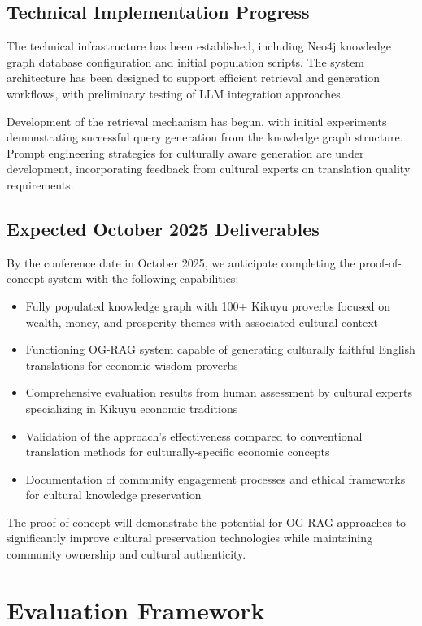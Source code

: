 \documentclass[
]{ceurart}
\begin{document}
\subsection{Technical Implementation Progress}

The technical infrastructure has been established, including Neo4j knowledge graph database configuration and initial population scripts. The system architecture has been designed to support efficient retrieval and generation workflows, with preliminary testing of LLM integration approaches.

Development of the retrieval mechanism has begun, with initial experiments demonstrating successful query generation from the knowledge graph structure. Prompt engineering strategies for culturally aware generation are under development, incorporating feedback from cultural experts on translation quality requirements.

\subsection{Expected October 2025 Deliverables}

By the conference date in October 2025, we anticipate completing the proof-of-concept system with the following capabilities:

\begin{itemize}
\item Fully populated knowledge graph with 100+ Kikuyu proverbs focused on wealth, money, and prosperity themes with associated cultural context
\item Functioning OG-RAG system capable of generating culturally faithful English translations for economic wisdom proverbs
\item Comprehensive evaluation results from human assessment by cultural experts specializing in Kikuyu economic traditions
\item Validation of the approach's effectiveness compared to conventional translation methods for culturally-specific economic concepts
\item Documentation of community engagement processes and ethical frameworks for cultural knowledge preservation
\end{itemize}

The proof-of-concept will demonstrate the potential for OG-RAG approaches to significantly improve cultural preservation technologies while maintaining community ownership and cultural authenticity.

\section{Evaluation Framework}
\end{document}
